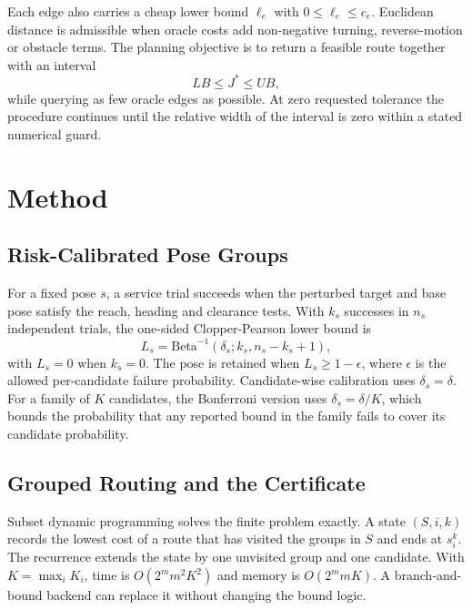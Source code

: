 \documentclass[conference]{IEEEtran}
\begin{document}
Each edge also carries a cheap lower bound $\ell_e$ with $0\le \ell_e\le c_e$. Euclidean distance is admissible when oracle costs add non-negative turning, reverse-motion or obstacle terms. The planning objective is to return a feasible route together with an interval
\begin{equation}
LB\le J^\ast\le UB,
\end{equation}
while querying as few oracle edges as possible. At zero requested tolerance the procedure continues until the relative width of the interval is zero within a stated numerical guard.

\section{Method}

\subsection{Risk-Calibrated Pose Groups}

For a fixed pose $s$, a service trial succeeds when the perturbed target and base pose satisfy the reach, heading and clearance tests. With $k_s$ successes in $n_s$ independent trials, the one-sided Clopper-Pearson lower bound is
\begin{equation}
L_s=\mathrm{Beta}^{-1}(\delta_s;k_s,n_s-k_s+1),
\end{equation}
with $L_s=0$ when $k_s=0$. The pose is retained when $L_s\ge 1-\epsilon$, where $\epsilon$ is the allowed per-candidate failure probability. Candidate-wise calibration uses $\delta_s=\delta$. For a family of $K$ candidates, the Bonferroni version uses $\delta_s=\delta/K$, which bounds the probability that any reported bound in the family fails to cover its candidate probability.

\subsection{Grouped Routing and the Certificate}

Subset dynamic programming solves the finite problem exactly. A state $(S,i,k)$ records the lowest cost of a route that has visited the groups in $S$ and ends at $s_i^k$. The recurrence extends the state by one unvisited group and one candidate. With $K=\max_i K_i$, time is $O(2^m m^2 K^2)$ and memory is $O(2^m mK)$. A branch-and-bound backend can replace it without changing the bound logic.
\end{document}
